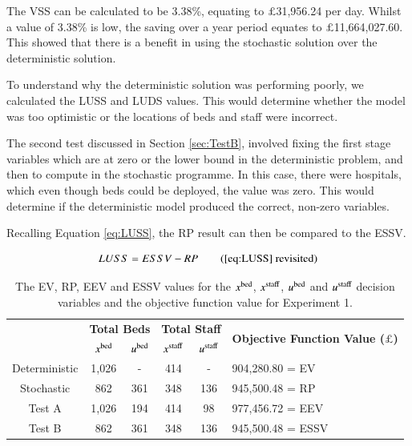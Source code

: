 \documentclass[../thesis.tex]{subfiles}
\begin{document}
The VSS can be calculated to be 3.38\%, equating to $\pounds$31,956.24 per day. Whilst a value of 3.38\% is low, the saving over a year period equates to $\pounds$11,664,027.60. This showed that there is a benefit in using the stochastic solution over the deterministic solution.

To understand why the deterministic solution was performing poorly, we calculated the LUSS and LUDS values. This would determine whether the model was too optimistic or the locations of beds and staff were incorrect.


The second test discussed in Section \ref{sec:TestB}, involved fixing the first stage variables which are at zero or the lower bound in the deterministic problem, and then to compute in the stochastic programme. In this case, there were hospitals, which even though beds could be deployed, the value was zero. This would determine if the deterministic model produced the correct, non-zero variables.

Recalling Equation \eqref{eq:LUSS}, the RP result can then be compared to the ESSV.

\begin{equation}
    LUSS = ESSV - RP\tag{\ref{eq:LUSS} revisited}
\end{equation}

\begin{table}[h!]
    \centering
    \begin{tabular}{cccccl}\toprule
 & \multicolumn{2}{l}{\textbf{Total Beds}} & \multicolumn{2}{c}{\textbf{Total Staff}} & \multirow{2}{*}{\textbf{Objective Function Value ($\pounds$)}}\\ \cmidrule(lr){2-3} \cmidrule(lr){4-5}
 & $x^\textnormal{bed}$           & $u^\textnormal{bed}$          & $x^\textnormal{staff}$         & $u^\textnormal{staff}$         \\ \midrule
       Deterministic & 1,026 & - &  414 & - & 904,280.80 =  EV \\ \midrule
      Stochastic & 862 & 361  & 348 & 136 & 945,500.48 = RP\\ \midrule
      Test A & 1,026 & 194 & 414&  98 &  977,456.72 = EEV \\\midrule
      Test B & 862 & 361  & 348 & 136 & 945,500.48 = ESSV\\ \bottomrule
    \end{tabular}
    \caption{The EV, RP, EEV and ESSV values for the $x^\textnormal{bed}$, $x^\textnormal{staff}$, $u^\textnormal{bed}$ and $u^\textnormal{staff}$ decision variables and the objective function value for Experiment 1.}
    \label{tab:eesveevdettwostageresults1}
\end{table}
\end{document}
